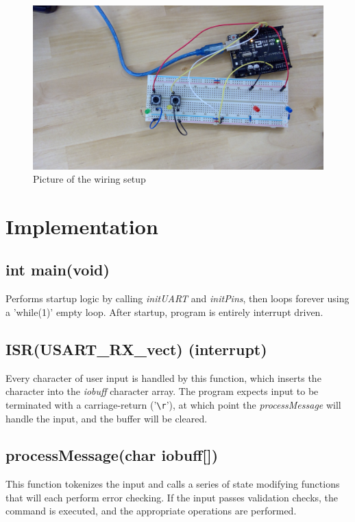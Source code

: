 \documentclass[letterpaper,11pt]{texMemo} %
\begin{document}
\begin{figure}[!ht]
\begin{center}
\includegraphics[width=\linewidth]{./configuration.jpg}
\caption{Picture of the wiring setup}
\end{center}
\end{figure}

\newpage
\section*{Implementation}

\subsection*{int main(void)}
Performs startup logic by calling \textit{initUART} and \textit{initPins}, then loops forever using a 'while(1)' empty loop. After startup, program is entirely interrupt driven. 

\subsection*{ISR(USART\_RX\_vect) (interrupt)}
Every character of user input is handled by this function, which inserts the character into the \textit{iobuff} character array. The program expects input to be terminated with a carriage-return ('\verb+\r+'), at which point the \textit{processMessage} will handle the input, and the buffer will be cleared.
\subsection*{processMessage(char iobuff[])}
This function tokenizes the input and calls a series of state modifying functions that will each perform error checking. If the input passes validation checks, the command is executed, and the appropriate operations are performed.
\end{document}
